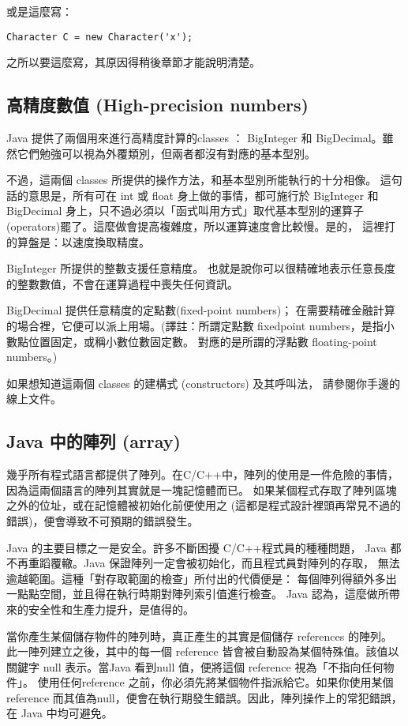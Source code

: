 或是這麼寫：
\begin{Verbatim}[frame=single]
Character C = new Character('x');
\end{Verbatim}

之所以要這麼寫，其原因得稍後章節才能說明清楚。
\subsection{高精度數值 (High-precision numbers)}
Java 提供了兩個用來進行高精度計算的classes ： BigInteger 和
BigDecimal。雖然它們勉強可以視為外覆類別，但兩者都沒有對應的基本型別。

不過，這兩個 classes 所提供的操作方法，和基本型別所能執行的十分相像。
這句話的意思是，所有可在 int 或 float 身上做的事情，都可施行於
BigInteger 和BigDecimal 身上，只不過必須以「函式叫用方式」取代基本型別的運算子
(operators)罷了。這麼做會提高複雜度，所以運算速度會比較慢。是的，
這裡打的算盤是：以速度換取精度。

BigInteger 所提供的整數支援任意精度。
也就是說你可以很精確地表示任意長度的整數數值，不會在運算過程中喪失任何資訊。

BigDecimal 提供任意精度的定點數(fixed-point numbers)；
在需要精確金融計算的場合裡，它便可以派上用場。(譯註：所謂定點數
fixedpoint numbers，是指小數點位置固定，或稱小數位數固定數。
對應的是所謂的浮點數 floating-point numbers。)

如果想知道這兩個 classes 的建構式 (constructors) 及其呼叫法，
請參閱你手邊的線上文件。

\subsection{Java 中的陣列 (array)}
幾乎所有程式語言都提供了陣列。在C/C++中，陣列的使用是一件危險的事情，
因為這兩個語言的陣列其實就是一塊記憶體而已。
如果某個程式存取了陣列區塊之外的位址，或在記憶體被初始化前便使用之
(這都是程式設計裡頭再常見不過的錯誤)，便會導致不可預期的錯誤發生。

Java 的主要目標之一是安全。許多不斷困擾 C/C++程式員的種種問題，
Java 都不再重蹈覆轍。Java 保證陣列一定會被初始化，而且程式員對陣列的存取，
無法逾越範圍。這種「對存取範圍的檢查」所付出的代價便是：
每個陣列得額外多出一點點空間，並且得在執行時期對陣列索引值進行檢查。
Java 認為，這麼做所帶來的安全性和生產力提升，是值得的。

當你產生某個儲存物件的陣列時，真正產生的其實是個儲存 references 的陣列。
此一陣列建立之後，其中的每一個 reference 皆會被自動設為某個特殊值。該值以關鍵字
null 表示。當Java 看到null 值，便將這個 reference 視為「不指向任何物件」。
使用任何reference 之前，你必須先將某個物件指派給它。如果你使用某個
reference 而其值為null，便會在執行期發生錯誤。因此，陣列操作上的常犯錯誤，在
Java 中均可避免。

